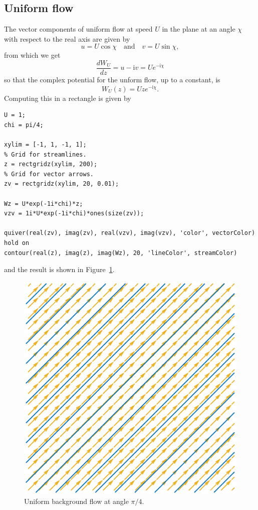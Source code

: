 \documentclass[12pt,fleqn]{article}
\renewcommand{\i}{\mathrm{i}}
\begin{document}
\subsection{Uniform flow}
The vector components of uniform flow at speed $U$ in the plane at an angle $\chi$ with respect to the real axis are given by
\[ u = U\cos\chi \quad\text{and}\quad v = U\sin \chi, \]
from which we get
\begin{equation*}
  \frac{dW_U}{dz} = u - \i v = Ue^{-\i\chi}
\end{equation*}
so that the complex potential for the unform flow, up to a constant, is
\begin{equation*}
  W_U(z) = Uze^{-\i\chi}.
\end{equation*}
Computing this in a rectangle is given by
\begin{lstlisting}
U = 1;
chi = pi/4;

xylim = [-1, 1, -1, 1];
% Grid for streamlines.
z = rectgridz(xylim, 200);
% Grid for vector arrows.
zv = rectgridz(xylim, 20, 0.01);

Wz = U*exp(-1i*chi)*z;
vzv = 1i*U*exp(-1i*chi)*ones(size(zv));

quiver(real(zv), imag(zv), real(vzv), imag(vzv), 'color', vectorColor)
hold on
contour(real(z), imag(z), imag(Wz), 20, 'lineColor', streamColor)
\end{lstlisting}
and the result is shown in Figure~\ref{fig:simpleuniform}.
\begin{figure}[htb]
  \centering
  \includegraphics[height=.4\textheight]{figures/simpleuniform.eps}
  \caption{Uniform background flow at angle $\pi/4$.}
  \label{fig:simpleuniform}
\end{figure}
\end{document}
